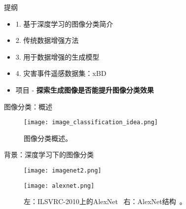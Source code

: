 
\begin{refsection}
  \begin{frame}{提纲}
    \begin{itemize}
      \item 1. 基于深度学习的图像分类简介
      \item 2. 传统数据增强方法
      \item 3. 用于数据增强的生成模型
      \item 4. 灾害事件遥感数据集：xBD
    \end{itemize}
    \begin{itemize}
      \item 项目 - \textbf{探索生成图像是否能提升图像分类效果}
    \end{itemize}
  \end{frame}
\end{refsection}

\begin{refsection}
  \begin{frame}{图像分类：概述}
    \begin{figure}
      \centering
      \texttt{[image: image\_classification\_idea.png]}
      \caption{\scriptsize 图像分类概述。}
    \end{figure}
    \bottomleftrefs
  \end{frame}
\end{refsection}

\begin{refsection}
  \begin{frame}{背景：深度学习下的图像分类}
    \begin{figure}
      \centering
      \begin{minipage}{0.48\linewidth}
        \centering
        \texttt{[image: imagenet2.png]}
      \end{minipage}\hfill
      \begin{minipage}{0.48\linewidth}
        \centering
        \texttt{[image: alexnet.png]}
      \end{minipage}
      \caption[]{\scriptsize 左：ILSVRC-2010上的AlexNet~\parencite{imagenet2010challenge} \quad 右：AlexNet结构~\parencite{krizhevskyImageNetClassificationDeep2012}。}
    \end{figure}
    \bottomleftrefs
  \end{frame}
\end{refsection}

